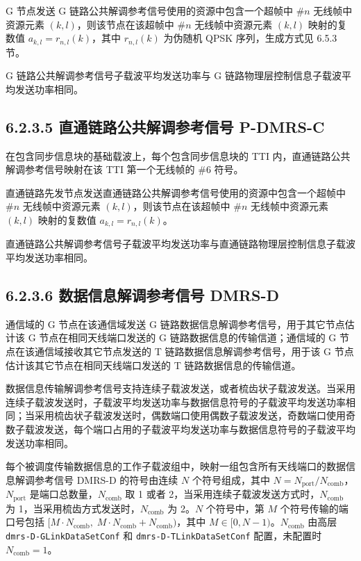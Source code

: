 \documentclass[11pt,a4paper]{ctexart}
\begin{document}
G 节点发送 G 链路公共解调参考信号使用的资源中包含一个超帧中 \#$n$ 无线帧中资源元素 $(k,l)$，则该节点在该超帧中 \#$n$ 无线帧中资源元素 $(k,l)$ 映射的复数值 $a_{k,l} = r_{n,l}(k)$，其中 $r_{n,l}(k)$ 为伪随机 QPSK 序列，生成方式见 6.5.3 节。

G 链路公共解调参考信号子载波平均发送功率与 G 链路物理层控制信息子载波平均发送功率相同。

\subsection{6.2.3.5 直通链路公共解调参考信号 P-DMRS-C}

在包含同步信息块的基础载波上，每个包含同步信息块的 TTI 内，直通链路公共解调参考信号映射在该 TTI 第一个无线帧的 \#6 符号。

直通链路先发节点发送直通链路公共解调参考信号使用的资源中包含一个超帧中 \#$n$ 无线帧中资源元素 $(k,l)$，则该节点在该超帧中 \#$n$ 无线帧中资源元素 $(k,l)$ 映射的复数值 $a_{k,l} = r_{n,l}(k)$。

直通链路公共解调参考信号子载波平均发送功率与直通链路物理层控制信息子载波平均发送功率相同。

\subsection{6.2.3.6 数据信息解调参考信号 DMRS-D}

通信域的 G 节点在该通信域发送 G 链路数据信息解调参考信号，用于其它节点估计该 G 节点在相同天线端口发送的 G 链路数据信息的传输信道；通信域的 G 节点在该通信域接收其它节点发送的 T 链路数据信息解调参考信号，用于该 G 节点估计该其它节点在相同天线端口发送的 T 链路数据信息的传输信道。

数据信息传输解调参考信号支持连续子载波发送，或者梳齿状子载波发送。当采用连续子载波发送时，子载波平均发送功率与数据信息符号的子载波平均发送功率相同；当采用梳齿状子载波发送时，偶数端口使用偶数子载波发送，奇数端口使用奇数子载波发送，每个端口占用的子载波平均发送功率与数据信息符号的子载波平均发送功率相同。

每个被调度传输数据信息的工作子载波组中，映射一组包含所有天线端口的数据信息解调参考信号 DMRS-D 的符号由连续 $N$ 个符号组成，其中 $N = N_{\mathrm{port}} / N_{\mathrm{comb}}$，$N_{\mathrm{port}}$ 是端口总数量，$N_{\mathrm{comb}}$ 取 1 或者 2，当采用连续子载波发送方式时，$N_{\mathrm{comb}}$ 为 1，当采用梳齿方式发送时，$N_{\mathrm{comb}}$ 为 2。$N$ 个符号中，第 $M$ 个符号传输的端口号包括 $[M \cdot N_{\mathrm{comb}},\; M \cdot N_{\mathrm{comb}} + N_{\mathrm{comb}})$，其中 $M \in [0, N-1)$。$N_{\mathrm{comb}}$ 由高层 \texttt{dmrs-D-GLinkDataSetConf} 和 \texttt{dmrs-D-TLinkDataSetConf} 配置，未配置时 $N_{\mathrm{comb}} = 1$。
\end{document}
